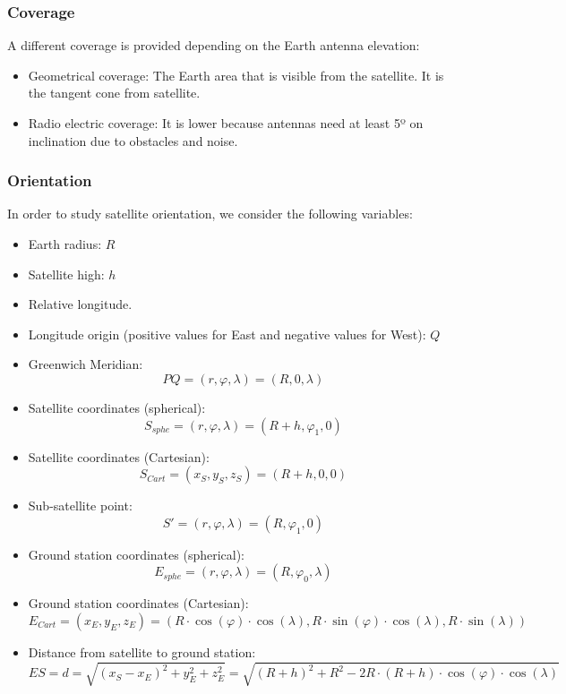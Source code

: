 \documentclass[../main.tex]{subfiles}
\begin{document}
\subsubsection{Coverage}

A different coverage is provided depending on the Earth antenna elevation:
\begin{itemize}
	\item Geometrical coverage: The Earth area that is visible from the satellite. It is the tangent cone from satellite.
	\item Radio electric coverage: It is lower because antennas need at least 5º on inclination due to obstacles and noise.
\end{itemize}

\subsubsection{Orientation}

In order to study satellite orientation, we consider the following variables:
\begin{itemize}
	\item Earth radius: $R$
	\item Satellite high: $h$
	\item Relative longitude.
	\item Longitude origin (positive values for East and negative values for West): $Q$
	\item {
		Greenwich Meridian:
		$$
			PQ = (r, \varphi, \lambda) = (R, 0, \lambda)
		$$
	}
	\item {
		Satellite coordinates (spherical):
		$$
			S_{sphe} = (r, \varphi, \lambda) = (R + h, \varphi_1, 0)
		$$
	}
	\item {
		Satellite coordinates (Cartesian):
		$$
			S_{Cart} = (x_S, y_S, z_S) = (R + h, 0, 0)
		$$
	}
	\item {
		Sub-satellite point:
		$$
			S' = (r, \varphi, \lambda) = (R, \varphi_1, 0)
		$$
	}
	\item {
		Ground station coordinates (spherical):
		$$
			E_{sphe} = (r, \varphi, \lambda) = (R, \varphi_0, \lambda)
		$$
	}
	\item {
		Ground station coordinates (Cartesian):
		$$
			E_{Cart} = (x_E, y_E, z_E) =
			(R \cdot \cos (\varphi) \cdot \cos (\lambda), R \cdot \sin (\varphi) \cdot \cos (\lambda), R \cdot \sin (\lambda) )
		$$
	}
	\item {
		Distance from satellite to ground station:
		$$
			ES = d =
			\sqrt{ (x_S - x_E )^2 + y_{E}^2 + z_{E}^2 } =
			\sqrt{ ( R + h )^2 + R^2 - 2 R \cdot (R+h) \cdot \cos(\varphi) \cdot \cos(\lambda) }
		$$
	}
\end{itemize}
\end{document}
